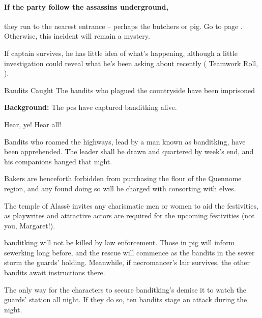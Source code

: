 \sewerthief


\paragraph{If the party follow the assassins underground,}
they run to the nearest entrance -- perhaps the butchers or \gls{pig}.
Go to page \pageref{sewers}.
Otherwise, this incident will remain a mystery.

If \gls{captain} survives, he has little idea of what's happening, although a little investigation could reveal what he's been asking about recently ( Teamwork Roll, \tn[10]).

{Bandits Caught}%
{The bandits who plagued the countryside have been imprisoned}%

\label{banditsCaught}

\textbf{Background:}
The \glspl{pc} have captured \gls{banditking} alive.

\begin{boxtext}

  Hear, ye!  Hear all!

  Bandits who roamed the highways, lead by a man known as \gls{banditking}, have been apprehended.  The leader shall be drawn and quartered by week's end, and his companions hanged that night.

  Bakers are henceforth forbidden from purchasing the flour of the Quennome region, and any found doing so will be charged with consorting with elves.

  The temple of Alass\"e invites any charismatic men or women to aid the festivities, as playwrites and attractive actors are required for the upcoming festivities (not you, Margaret!).

\end{boxtext}

\Gls{banditking} will not be killed by law enforcement.
Those in \gls{pig} will inform \gls{sewerking} long before, and the rescue will commence as the bandits in the sewer storm the guards' holding.
Meanwhile, if \gls{necromancer}'s lair survives, the other bandits await instructions there.


The only way for the characters to secure \gls{banditking}'s demise it to watch the guards' station all night.
If they do so, ten bandits stage an attack during the night.

